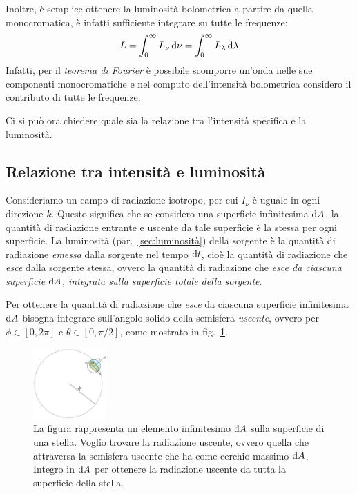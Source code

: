 Inoltre, è semplice ottenere la luminosità bolometrica a partire da quella monocromatica, è infatti sufficiente integrare su tutte le frequenze:
\begin{equation}\label{eq:luminosità-bolometrica}
    L = \int_0^\infty L_\nu \mathop{\mathrm{{}d}}\mathopen{} \nu = \int_0^\infty L_\lambda \mathop{\mathrm{{}d}}\mathopen{} \lambda
\end{equation}
Infatti, per il \emph{teorema di Fourier} è possibile scomporre un'onda nelle sue componenti monocromatiche e nel computo dell'intensità bolometrica considero il contributo di tutte le frequenze.

Ci si può ora chiedere quale sia la relazione tra l'intensità specifica e la luminosità.

\subsection{Relazione tra intensità e luminosità}\label{sec:relazione-intensità-luminosità}
Consideriamo un campo di radiazione isotropo, per cui $I_\nu$ è uguale in ogni direzione $k$. Questo significa che se considero una superficie infinitesima $\mathop{\mathrm{{}d}}\mathopen{} A$, la quantità di radiazione entrante e uscente da tale superficie è la stessa per ogni superficie. La luminosità (par.~\ref{sec:luminosità}) della sorgente è la quantità di radiazione \emph{emessa} dalla sorgente nel tempo $\mathop{\mathrm{{}d}}\mathopen{} t$, cioè la quantità di radiazione che \emph{esce} dalla sorgente stessa, ovvero la quantità di radiazione che \emph{esce da ciascuna superficie $\mathop{\mathrm{{}d}}\mathopen{} A$, integrata sulla superficie totale della sorgente}.

Per ottenere la quantità di radiazione che \emph{esce} da ciascuna superficie infinitesima $\mathop{\mathrm{{}d}}\mathopen{} A$ bisogna integrare sull'angolo solido della semisfera \emph{uscente}, ovvero per $\phi \in [0, 2\pi]$ e $\theta \in [0, \pi/2]$, come mostrato in fig.~\ref{fig:emisfera-uscente}.

\begin{figure}
\centering
\includegraphics[width=0.25\textwidth]{immagini/emisfera-uscente.jpg}
\caption{La figura rappresenta un elemento infinitesimo $\mathop{\mathrm{{}d}}\mathopen{} A$ sulla superficie di una stella. Voglio trovare la radiazione uscente, ovvero quella che attraversa la semisfera uscente che ha come cerchio massimo $\mathop{\mathrm{{}d}}\mathopen{} A$. Integro in $\mathop{\mathrm{{}d}}\mathopen{} A$ per ottenere la radiazione uscente da tutta la superficie della stella.}
\label{fig:emisfera-uscente}
\end{figure}

